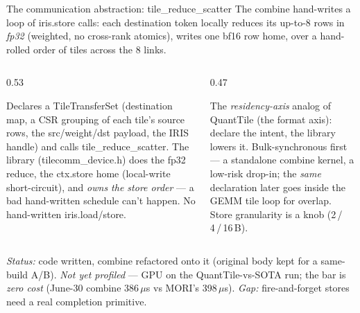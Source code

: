 \documentclass[pdf,aspectratio=169]{beamer}
\newcommand{\empy}[1]{{\color{darkorange}\emph{#1}}}
\newcommand{\empr}[1]{{\color{cardinalred}\emph{#1}}}
\newcommand{\examplebox}[2]{%
\begin{tcolorbox}[colframe=darkcardinal,colback=boxgray,title={#1}]
#2
\end{tcolorbox}}
\newcommand{\mc}[1]{{\ttfamily\small #1}}
\begin{document}
\begin{frame}{The communication abstraction: \mc{tile\_reduce\_scatter}}
\small
The combine hand-writes a loop of \mc{iris.store} calls: each destination token locally reduces its up-to-8 rows in \empy{fp32} (weighted, no cross-rank atomics), writes one bf16 row home, over a hand-rolled order of tiles across the 8 links.
\vspace{0.3ex}
\begin{columns}
\begin{column}{0.53\textwidth}
\examplebox{Declare the transfer, the library lowers it}{\footnotesize
Declares a \mc{TileTransferSet} (destination map, a CSR grouping of each tile's source rows, the src/weight/dst payload, the IRIS handle) and calls \mc{tile\_reduce\_scatter}. The library (\mc{tilecomm\_device.h}) does the fp32 reduce, the \mc{ctx.store} home (local-write short-circuit), and \empr{owns the store order} --- a bad hand-written schedule can't happen. No hand-written \mc{iris.load/store}.}
\end{column}
\begin{column}{0.47\textwidth}
\examplebox{Why this shape}{\footnotesize
The \empy{residency-axis} analog of QuantTile (the format axis): declare the intent, the library lowers it. Bulk-synchronous first --- a standalone combine kernel, a low-risk drop-in; the \emph{same} declaration later goes inside the GEMM tile loop for overlap. Store granularity is a knob (2\,/\,4\,/\,16\,B).}
\end{column}
\end{columns}
\vspace{0.4ex}

{\footnotesize \empy{Status:} code written, combine refactored onto it (original body kept for a same-build A/B). \empr{Not yet profiled} --- GPU on the QuantTile-vs-SOTA run; the bar is \empy{zero cost} (June-30 combine 386\,$\mu$s vs MORI's 398\,$\mu$s). \empy{Gap:} fire-and-forget stores need a real completion primitive.}
\end{frame}
\end{document}
